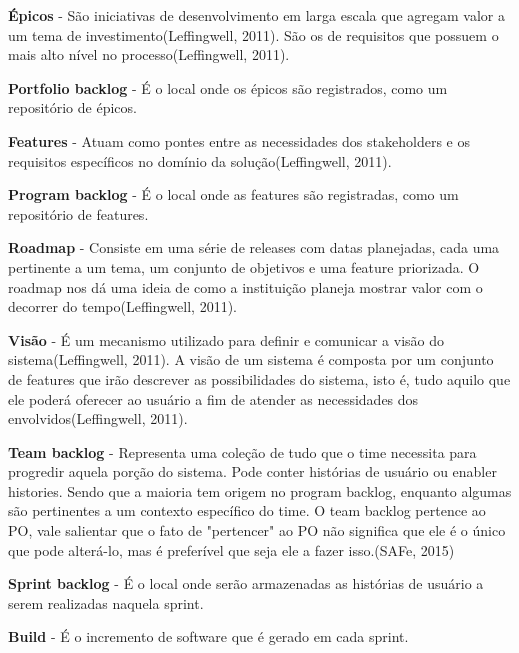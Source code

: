 \textbf{Épicos} - São iniciativas de desenvolvimento em larga escala que agregam valor a um tema de investimento(Leffingwell, 2011). São os de requisitos que possuem o mais alto nível no processo(Leffingwell, 2011).

\textbf{Portfolio backlog} - É o local onde os épicos são registrados, como um repositório de épicos.

\textbf{Features} - Atuam como pontes entre as necessidades dos stakeholders e os requisitos específicos no domínio da solução(Leffingwell, 2011).

\textbf{Program backlog} - É o local onde as features são registradas, como um repositório de features.

\textbf{Roadmap} - Consiste em uma série de releases com datas planejadas, cada uma pertinente a um tema, um conjunto de objetivos e uma feature priorizada. O roadmap nos dá uma ideia de como a instituição planeja mostrar valor com o decorrer do tempo(Leffingwell, 2011).

\textbf{Visão} - É um mecanismo utilizado para definir e comunicar a visão do sistema(Leffingwell, 2011). A visão de um sistema é composta por um conjunto de features que irão descrever as possibilidades do sistema, isto é, tudo aquilo que ele poderá oferecer ao usuário a fim de atender as necessidades dos envolvidos(Leffingwell, 2011).

\textbf{Team backlog} - Representa uma coleção de tudo que o time necessita para progredir aquela porção do sistema. Pode conter histórias de usuário ou enabler histories. Sendo que a maioria tem origem no program backlog, enquanto algumas são pertinentes a um contexto específico do time. O team backlog pertence ao PO, vale salientar que o fato de "pertencer" ao PO não significa que ele é o único que pode alterá-lo, mas é preferível que seja ele a fazer isso.(SAFe, 2015)

\textbf{Sprint backlog} - É o local onde serão armazenadas as histórias de usuário a serem realizadas naquela sprint.

\textbf{Build} - É o incremento de software que é gerado em cada sprint.